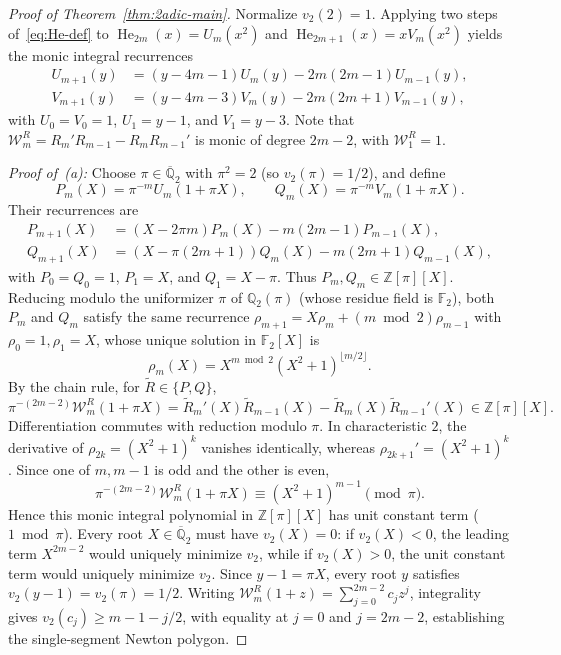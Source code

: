 \documentclass[11pt,reqno]{amsart}
\numberwithin{equation}{section}
\theoremstyle{definition}
\theoremstyle{remark}
\newcommand{\Q}{\mathbb{Q}}
\newcommand{\Z}{\mathbb{Z}}
\newcommand{\F}{\mathbb{F}}
\newcommand{\He}{\operatorname{He}}
\begin{document}
\begin{proof}[Proof of Theorem~\ref{thm:2adic-main}]
Normalize $v_2(2)=1$. Applying two steps of~\eqref{eq:He-def} to $\He_{2m}(x)=U_m(x^2)$ and $\He_{2m+1}(x)=xV_m(x^2)$ yields the monic integral recurrences
\begin{align*}
U_{m+1}(y) &= (y-4m-1)U_m(y) - 2m(2m-1)U_{m-1}(y),\\
V_{m+1}(y) &= (y-4m-3)V_m(y) - 2m(2m+1)V_{m-1}(y),
\end{align*}
with $U_0=V_0=1$, $U_1=y-1$, and $V_1=y-3$. Note that $\mathcal{W}_m^R=R_m'R_{m-1}-R_mR_{m-1}'$ is monic of degree $2m-2$, with $\mathcal{W}_1^R=1$.

\smallskip
\noindent\emph{Proof of~(a):} Choose $\pi\in\overline{\Q}_2$ with $\pi^2=2$ (so $v_2(\pi)=1/2$), and define
\[
P_m(X) = \pi^{-m} U_m(1+\pi X),\qquad Q_m(X) = \pi^{-m} V_m(1+\pi X).
\]
Their recurrences are
\begin{align*}
P_{m+1}(X) &= (X - 2\pi m)P_m(X) - m(2m-1)P_{m-1}(X),\\
Q_{m+1}(X) &= (X - \pi(2m+1))Q_m(X) - m(2m+1)Q_{m-1}(X),
\end{align*}
with $P_0=Q_0=1$, $P_1=X$, and $Q_1=X-\pi$. Thus $P_m,Q_m\in\Z[\pi][X]$. Reducing modulo the uniformizer $\pi$ of $\Q_2(\pi)$ (whose residue field is $\F_2$), both $P_m$ and $Q_m$ satisfy the same recurrence $\rho_{m+1}=X\rho_m + (m\bmod 2)\rho_{m-1}$ with $\rho_0=1,\rho_1=X$, whose unique solution in $\F_2[X]$ is
\[
\rho_m(X) = X^{m\bmod 2}(X^2+1)^{\lfloor m/2\rfloor}.
\]
By the chain rule, for $\widetilde{R}\in\{P,Q\}$,
\[
\pi^{-(2m-2)}\mathcal{W}_m^R(1+\pi X) = \widetilde{R}_m'(X)\widetilde{R}_{m-1}(X) - \widetilde{R}_m(X)\widetilde{R}_{m-1}'(X) \in \Z[\pi][X].
\]
Differentiation commutes with reduction modulo $\pi$. In characteristic $2$, the derivative of $\rho_{2k}=(X^2+1)^k$ vanishes identically, whereas $\rho_{2k+1}'=(X^2+1)^k$. Since one of $m,m-1$ is odd and the other is even,
\[
\pi^{-(2m-2)}\mathcal{W}_m^R(1+\pi X) \equiv (X^2+1)^{m-1} \pmod{\pi}.
\]
Hence this monic integral polynomial in $\Z[\pi][X]$ has unit constant term ($1\bmod\pi$). Every root $X\in\overline{\Q}_2$ must have $v_2(X)=0$: if $v_2(X)<0$, the leading term $X^{2m-2}$ would uniquely minimize $v_2$, while if $v_2(X)>0$, the unit constant term would uniquely minimize $v_2$. Since $y-1=\pi X$, every root $y$ satisfies $v_2(y-1)=v_2(\pi)=1/2$. Writing $\mathcal{W}_m^R(1+z)=\sum_{j=0}^{2m-2}c_j z^j$, integrality gives $v_2(c_j)\ge m-1-j/2$, with equality at $j=0$ and $j=2m-2$, establishing the single-segment Newton polygon.


\end{proof}
\end{document}
